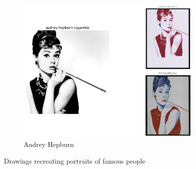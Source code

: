 \begin{figure}
     \begin{subfigure}[b]{0.45\textwidth}
         \centering
         \includegraphics[width=\textwidth]{images/example_pairs/audrey-hepburn-cigarette.png}
         \caption{Audrey Hepburn\footnotemark}
     \end{subfigure}
    \caption{Drawings recreating portraits of famous people}
    \label{fig:pairs-example-2}
\end{figure}


